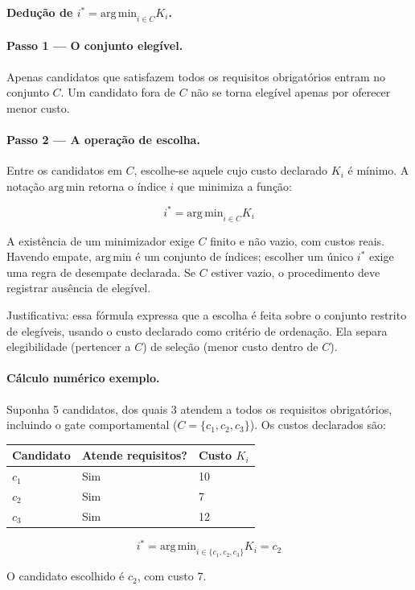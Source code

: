 \begin{metodo}
\textbf{Dedução de $i^*=\mathrm{arg\,min}_{i\in C}K_i$.}

\paragraph{Passo 1 — O conjunto elegível.}
Apenas candidatos que satisfazem todos os requisitos obrigatórios entram no conjunto $C$. Um candidato fora de $C$ não se torna elegível apenas por oferecer menor custo.

\paragraph{Passo 2 — A operação de escolha.}
Entre os candidatos em $C$, escolhe-se aquele cujo custo declarado $K_i$ é mínimo. A notação $\mathrm{arg\,min}$ retorna o índice $i$ que minimiza a função:

\[
\boxed{i^* = \mathrm{arg\,min}_{i\in C} K_i}
\]

A existência de um minimizador exige $C$ finito e não vazio, com custos reais. Havendo empate, $\mathrm{arg\,min}$ é um conjunto de índices; escolher um único $i^*$ exige uma regra de desempate declarada. Se $C$ estiver vazio, o procedimento deve registrar ausência de elegível.

Justificativa: essa fórmula expressa que a escolha é feita sobre o conjunto restrito de elegíveis, usando o custo declarado como critério de ordenação. Ela separa elegibilidade (pertencer a $C$) de seleção (menor custo dentro de $C$).

\paragraph{Cálculo numérico exemplo.}
Suponha 5 candidatos, dos quais 3 atendem a todos os requisitos obrigatórios,
incluindo o gate comportamental ($C = \{c_1, c_2, c_3\}$). Os custos declarados são:

\begin{center}
\begin{tabularx}{\linewidth}{YYY}
Candidato & Atende requisitos? & Custo $K_i$ \\
\midrule
$c_1$ & Sim & 10 \\
$c_2$ & Sim & 7 \\
$c_3$ & Sim & 12 \\
\end{tabularx}
\end{center}

\[
i^* = \mathrm{arg\,min}_{i\in\{c_1,c_2,c_3\}} K_i = c_2
\]

O candidato escolhido é $c_2$, com custo 7.
\end{metodo}

